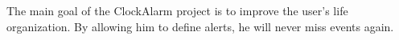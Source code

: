 The main goal of the ClockAlarm project is to improve the user's life
organization. By allowing him to define alerts, he will never miss events
again.
